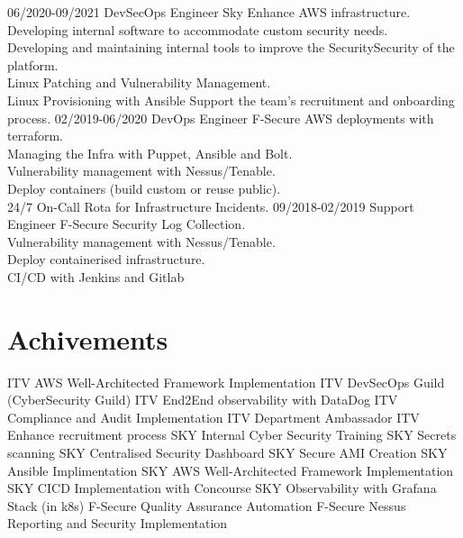 \documentclass[]{twentysecondcv}
\begin{document}
\begin{twenty}
{  }
  \twentyitem
  {06/2020-09/2021}
  {DevSecOps Engineer}
  {Sky}
  {Enhance AWS infrastructure.\\
    Developing internal software to accommodate custom security needs.\\
    Developing and maintaining internal tools to improve the SecuritySecurity of the platform.\\
    Linux Patching and Vulnerability Management.\\
    Linux Provisioning with Ansible
    Support the team's recruitment and onboarding process.
  }
  \twentyitem
  {02/2019-06/2020}
  {DevOps Engineer}
  {F-Secure}
  {AWS deployments with terraform.\\
    Managing the Infra with Puppet, Ansible and Bolt.\\
    Vulnerability management with Nessus/Tenable.\\
    Deploy containers (build custom or reuse public).\\
    24/7 On-Call Rota for Infrastructure Incidents.
  }
  \twentyitem
  {09/2018-02/2019}
  {Support Engineer}
  {F-Secure}
  {Security Log Collection.\\
    Vulnerability management with Nessus/Tenable.\\
    Deploy containerised infrastructure.\\
    CI/CD with Jenkins and Gitlab
  }
\end{twenty}


\newpage


\section{Achivements}
\begin{twentyshort}
  \twentyitemshort
  {ITV}
  {AWS Well-Architected Framework Implementation}
  \twentyitemshort
  {ITV}
  {DevSecOps Guild (CyberSecurity Guild)}
  \twentyitemshort
  {ITV}
  {End2End observability with DataDog}
  \twentyitemshort
  {ITV}
  {Compliance and Audit Implementation}
  \twentyitemshort
  {ITV}
  {Department Ambassador}
  \twentyitemshort
  {ITV}
  {Enhance recruitment process}
  \twentyitemshort
  {SKY}
  {Internal Cyber Security Training}
  \twentyitemshort
  {SKY}
  {Secrets scanning }
  \twentyitemshort
  {SKY}
  {Centralised Security Dashboard}
  \twentyitemshort
  {SKY}
  {Secure AMI Creation}
  \twentyitemshort
  {SKY}
  {Ansible Implimentation}
  \twentyitemshort
  {SKY}
  {AWS Well-Architected Framework Implementation}
  \twentyitemshort
  {SKY}
  {CICD Implementation with Concourse}
  \twentyitemshort
  {SKY}
  {Observability with Grafana Stack (in k8s)}
  \twentyitemshort
  {F-Secure}
  {Quality Assurance Automation}
  \twentyitemshort
  {F-Secure}
  {Nessus Reporting and Security Implementation}
\end{twentyshort}
\end{document}
